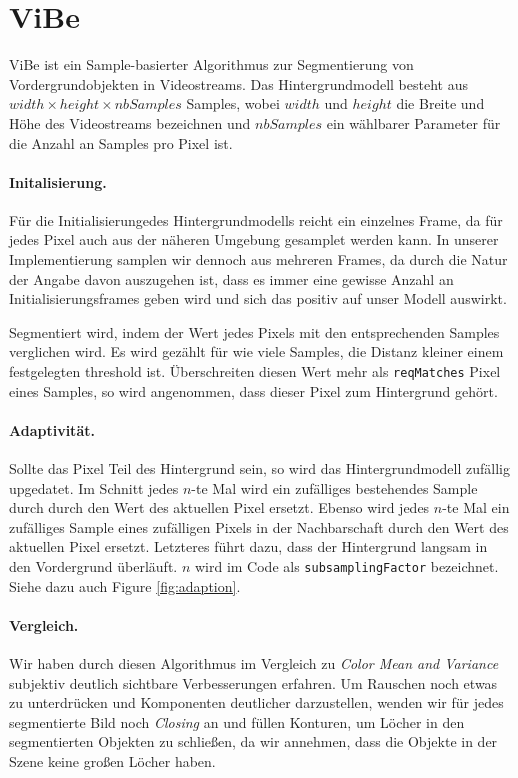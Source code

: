 \documentclass[]{scrartcl}
\begin{document}
\section{ViBe}\label{sec:vibe}
ViBe ist ein Sample-basierter Algorithmus zur Segmentierung von Vordergrundobjekten in Videostreams. Das Hintergrundmodell besteht aus $width \times height \times nbSamples$ Samples, wobei $width$ und $height$ die Breite und H\"ohe des Videostreams bezeichnen und $nbSamples$ ein w\"ahlbarer Parameter f\"ur die Anzahl an Samples pro Pixel ist. 

\paragraph{Initalisierung.}
F\"ur die Initialisierungedes Hintergrundmodells reicht ein einzelnes Frame, da f\"ur jedes Pixel auch aus der n\"aheren Umgebung gesamplet werden kann. In unserer Implementierung samplen wir dennoch aus mehreren Frames, da durch die Natur der Angabe davon auszugehen ist, dass es immer eine gewisse Anzahl an Initialisierungsframes geben wird und sich das positiv auf unser Modell auswirkt.

Segmentiert wird, indem der Wert jedes Pixels mit den entsprechenden Samples verglichen wird. Es wird gez\"ahlt f\"ur wie viele Samples, die Distanz kleiner einem festgelegten threshold ist. \"Uberschreiten diesen Wert mehr als \texttt{reqMatches} Pixel eines Samples, so wird angenommen, dass dieser Pixel zum Hintergrund geh\"ort.

\paragraph{Adaptivit\"at.}
Sollte das Pixel Teil des Hintergrund sein, so wird das Hintergrundmodell zuf\"allig upgedatet. Im Schnitt jedes $n$-te Mal wird ein zuf\"alliges bestehendes Sample durch durch den Wert des aktuellen Pixel ersetzt. Ebenso wird jedes $n$-te Mal ein zuf\"alliges Sample eines zuf\"alligen Pixels in der Nachbarschaft durch den Wert des aktuellen Pixel ersetzt. Letzteres f\"uhrt dazu, dass der Hintergrund langsam in den Vordergrund \"uberl\"auft. $n$ wird im Code als \texttt{subsamplingFactor} bezeichnet. Siehe dazu auch Figure \ref{fig:adaption}.

\paragraph{Vergleich.}
Wir haben durch diesen Algorithmus im Vergleich zu \textit{Color Mean and Variance} subjektiv deutlich sichtbare Verbesserungen erfahren. Um Rauschen noch etwas zu unterdr\"ucken und Komponenten deutlicher darzustellen, wenden wir f\"ur jedes segmentierte Bild noch \textit{Closing} an und f\"ullen Konturen, um L\"ocher in den segmentierten Objekten zu schließen, da wir annehmen, dass die Objekte in der Szene keine gro\ss{}en L\"ocher haben.
\end{document}
